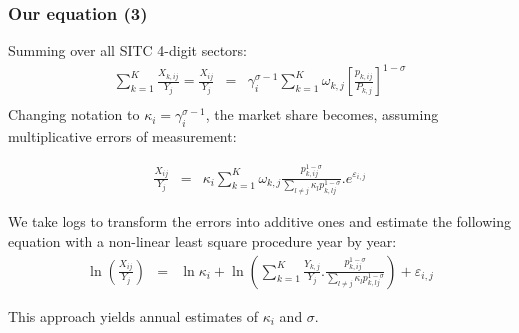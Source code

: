 \documentclass{beamer}
\begin{document}
\begin{frame}[plain]\frametitle{Our equation (3)}

Summing over all SITC 4-digit sectors: 
\[\begin{array}{*{35}{l}}
\sum\limits_{k=1}^{K}{\frac{{{X}_{k,ij}}}{{{Y}_{j}}}}=\frac{{{X}_{ij}}}{{{Y}_{j}}} & = & \gamma _{i}^{\sigma -1}\sum\limits_{k=1}^{K}{{{\omega }_{k,j}}}{{\left[ \frac{{{p}_{k,ij}}}{{{P}_{k,j}}} \right]}^{1-\sigma }}  \\
\end{array}\]
Changing notation to $\kappa_i=\gamma_i^{\sigma-1}$, the market share becomes, assuming multiplicative errors of measurement:


\begin{eqnarray}
\frac{{{X}_{ij}}}{{{Y}_{j}}} & = & {{\kappa }_{i}}\sum\limits_{k=1}^{K}{{{\omega }_{k,j}}}\frac{p_{k,ij}^{1-\sigma }}{\sum\limits_{l\ne j}{{{\kappa }_{l}}}p_{k,lj}^{1-\sigma }}.{{e}^{{{\varepsilon }_{i,j}}}} \nonumber
\end{eqnarray}

We take logs to transform the errors into additive ones and estimate the following equation with a non-linear least square procedure year by year:
\begin{eqnarray}
\ln \left( \frac{{{X}_{ij}}}{{{Y}_{j}}} \right) & = & \ln {{\kappa }_{i}} +\ln \left( \sum\limits_{k=1}^{K}{\frac{{{Y}_{k,j}}}{{{Y}_{j}}}.}\frac{p_{k,ij}^{1-\sigma }}{\sum\limits_{l\ne j}{{{\kappa }_{l}}}p_{k,lj}^{1-\sigma }} \right) +{{\varepsilon }_{i,j}}
\end{eqnarray}

This approach yields annual estimates of ${{\kappa }_{i}}$ and $\sigma $.

\end{frame}
\end{document}
